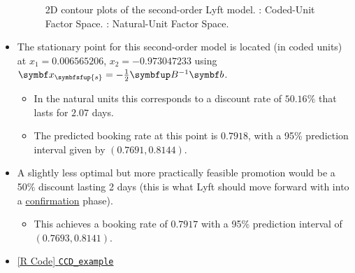\begin{itemize}
\begin{figure}[!htbp]
\begin{subfigure}{0.48\textwidth}
              \end{subfigure}
              \caption{2D contour plots of the second-order Lyft model.
                  : Coded-Unit Factor Space.
                  : Natural-Unit Factor Space.}\label{fig:Lyft}
          \end{figure}
    \item The stationary point for this second-order model is located (in coded units) at $ x_1 = 0.006565206$,
          $ x_2 = -0.973047233 $ using $ \Vector{x}_{\symbfsfup{s}}=-\frac{1}{2} \Matrix{B}^{-1}\Vector{b} $.
          \begin{itemize}
              \item In the natural units this corresponds to a discount rate of $50.16\%$ that lasts for $2.07$ days.
              \item The predicted booking rate at this point is $0.7918$, with a 95\% prediction interval given by $(0.7691, 0.8144)$.
          \end{itemize}
    \item A slightly less optimal but more practically feasible promotion would be a 50\% discount lasting 2 days (this is what Lyft should move forward with into a \underline{confirmation} phase).
          \begin{itemize}
              \item This achieves a booking rate of $0.7917$ with a 95\% prediction interval of $(0.7693, 0.8141)$.
          \end{itemize}
    \item \href{https://github.com/Hextical/university-notes/blob/master/year-3/semester-3/STAT 430/code/W12/CCD_example.R}{[R Code] \texttt{CCD\_example}}
\end{itemize}
